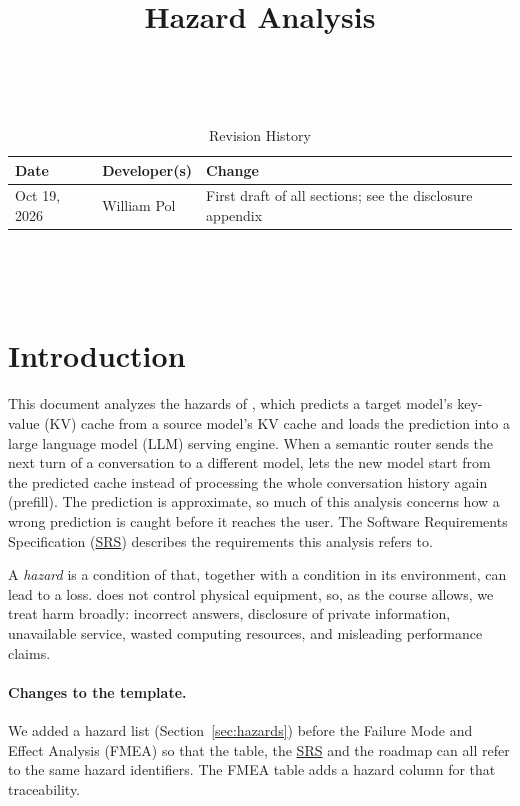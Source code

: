 \documentclass{article}
\title{Hazard Analysis\\\progname}
\author{\authname}
\date{}
\newcommand{\srs}{\href{../SRS-Volere/SRS.pdf}{SRS}}
\begin{document}
\maketitle
\thispagestyle{empty}

~\newpage


\begin{table}[hp]
\caption{Revision History} \label{TblRevisionHistory}
\begin{tabularx}{\textwidth}{llX}
\toprule
\textbf{Date} & \textbf{Developer(s)} & \textbf{Change}\\
\midrule
Oct 19, 2026 & William Pol & First draft of all sections; see the
disclosure appendix\\
\bottomrule
\end{tabularx}
\end{table}

~\newpage

\tableofcontents

~\newpage


\section{Introduction}
\label{sec:intro}

This document analyzes the hazards of \progname{}, which predicts a target
model's key-value (KV) cache from a source model's KV cache and loads the
prediction into a large language model (LLM) serving engine. When a
semantic router sends the next turn of a conversation to a different model,
\progname{} lets the new model start from the predicted cache instead of
processing the whole conversation history again (prefill). The prediction
is approximate, so much of this analysis concerns how a wrong prediction is
caught before it reaches the user. The Software Requirements
Specification (\srs{}) describes the requirements this analysis refers to.

A \emph{hazard} is a condition of \progname{} that, together with a
condition in its environment, can lead to a loss. \progname{} does not
control physical equipment, so, as the course allows, we treat harm
broadly: incorrect answers, disclosure of private information, unavailable
service, wasted computing resources, and misleading performance claims.

\paragraph{Changes to the template.} We added a hazard list
(Section~\ref{sec:hazards}) before the Failure Mode and Effect Analysis
(FMEA) so that the table, the \srs{} and the roadmap can all refer to the
same hazard identifiers. The FMEA table adds a hazard column for that
traceability.
\end{document}
